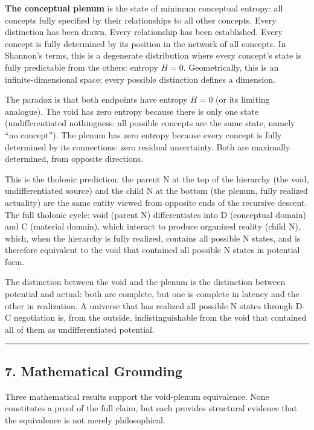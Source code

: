 \documentclass[
  11pt,
  letterpaper,
]{article}
\begin{document}
\textbf{The conceptual plenum} is the state of minimum conceptual
entropy: all concepts fully specified by their relationships to all
other concepts. Every distinction has been drawn. Every relationship has
been established. Every concept is fully determined by its position in
the network of all concepts. In Shannon's terms, this is a degenerate
distribution where every concept's state is fully predictable from the
others: entropy \(H = 0\). Geometrically, this is an
infinite-dimensional space: every possible distinction defines a
dimension.

The paradox is that both endpoints have entropy \(H = 0\) (or its
limiting analogue). The void has zero entropy because there is only one
state (undifferentiated nothingness: all possible concepts are the same
state, namely ``no concept''). The plenum has zero entropy because every
concept is fully determined by its connections: zero residual
uncertainty. Both are maximally determined, from opposite directions.

This is the tholonic prediction: the parent N at the top of the
hierarchy (the void, undifferentiated source) and the child N at the
bottom (the plenum, fully realized actuality) are the same entity viewed
from opposite ends of the recursive descent. The full tholonic cycle:
void (parent N) differentiates into D (conceptual domain) and C
(material domain), which interact to produce organized reality (child
N), which, when the hierarchy is fully realized, contains all possible N
states, and is therefore equivalent to the void that contained all
possible N states in potential form.

The distinction between the void and the plenum is the distinction
between potential and actual: both are complete, but one is complete in
latency and the other in realization. A universe that has realized all
possible N states through D-C negotiation is, from the outside,
indistinguishable from the void that contained all of them as
undifferentiated potential.

\begin{center}\rule{0.5\linewidth}{0.5pt}\end{center}

\subsection{7. Mathematical Grounding}\label{mathematical-grounding}

Three mathematical results support the void-plenum equivalence. None
constitutes a proof of the full claim, but each provides structural
evidence that the equivalence is not merely philosophical.
\end{document}
